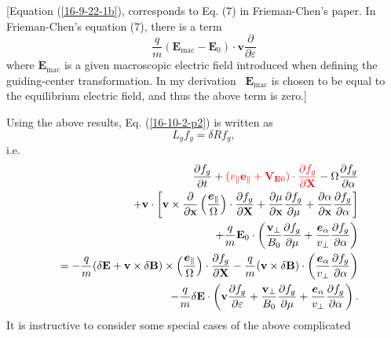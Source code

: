 \documentclass{llncs}
\newcommand{\tmcolor}[2]{{\color{#1}{#2}}}
\newcommand{\tmmathbf}[1]{\ensuremath{\boldsymbol{#1}}}
\newcommand{\tmop}[1]{\ensuremath{\operatorname{#1}}}
\begin{document}
[Equation (\ref{16-9-22-1b}), corresponds to Eq. (7) in Frieman-Chen's
paper{\cite{frieman1982}}. In Frieman-Chen's equation (7), there is a term
\[ \frac{q}{m} (\mathbf{E}_{\tmop{mac}} -\mathbf{E}_0) \cdot \mathbf{v}
   \frac{\partial}{\partial \varepsilon} \]
where $\mathbf{E}_{\tmop{mac}}$ is a given macroscopic electric field
introduced when defining the guiding-center transformation. In my derivation \
$\mathbf{E}_{\tmop{mac}}$ is chosen to be equal to the equilibrium electric
field, and thus the above term is zero.]

Using the above results, Eq. (\ref{16-10-2-p2}) is written as
\begin{equation}
  \label{16-9-22-p1} L_g f_g = \delta R f_g,
\end{equation}
i.e.
\begin{eqnarray}
  &  & \frac{\partial f_g}{\partial t} + \tmcolor{red}{(v_{\parallel}
  \mathbf{e}_{\parallel} +\mathbf{V}_{\mathbf{E}0}) \cdot \frac{\partial
  f_g}{\partial \mathbf{X}}} - \Omega \frac{\partial f_g}{\partial \alpha}
  \nonumber\\
  &  & +\mathbf{v} \cdot \left[ \mathbf{v} \times \frac{\partial}{\partial
  \mathbf{x}} \left( \frac{\tmmathbf{e}_{\parallel}}{\Omega} \right) \cdot
  \frac{\partial f_g}{\partial \mathbf{X}} + \frac{\partial \mu}{\partial
  \mathbf{x}}  \frac{\partial f_g}{\partial \mu} + \frac{\partial
  \alpha}{\partial \mathbf{x}}  \frac{\partial f_g}{\partial \alpha} \right]
  \nonumber\\
  &  & + \frac{q}{m} \mathbf{E}_0 \cdot \left( \frac{\mathbf{v}_{\perp}}{B_0}
  \frac{\partial f_g}{\partial \mu} + \frac{\tmmathbf{e}_{\alpha}}{v_{\perp}}
  \frac{\partial f_g}{\partial \alpha} \right) \nonumber\\
  &  & = - \frac{q}{m} (\delta \mathbf{E}+\mathbf{v} \times \delta
  \mathbf{B}) \times \left( \frac{\tmmathbf{e}_{\parallel}}{\Omega}  \right)
  \cdot \frac{\partial f_g}{\partial \mathbf{X}} - \frac{q}{m} (\mathbf{v}
  \times \delta \mathbf{B}) \cdot \left(
  \frac{\tmmathbf{e}_{\alpha}}{v_{\perp}}  \frac{\partial f_g}{\partial
  \alpha} \right) \nonumber\\
  &  & - \frac{q}{m} \delta \mathbf{E} \cdot \left( \mathbf{v} \frac{\partial
  f_g}{\partial \varepsilon} + \frac{\mathbf{v}_{\perp}}{B_0}  \frac{\partial
  f_g}{\partial \mu} + \frac{\tmmathbf{e}_{\alpha}}{v_{\perp}}  \frac{\partial
  f_g}{\partial \alpha} \right) .  \label{18-12-16-1}
\end{eqnarray}
It is instructive to consider some special cases of the above complicated
\end{document}
